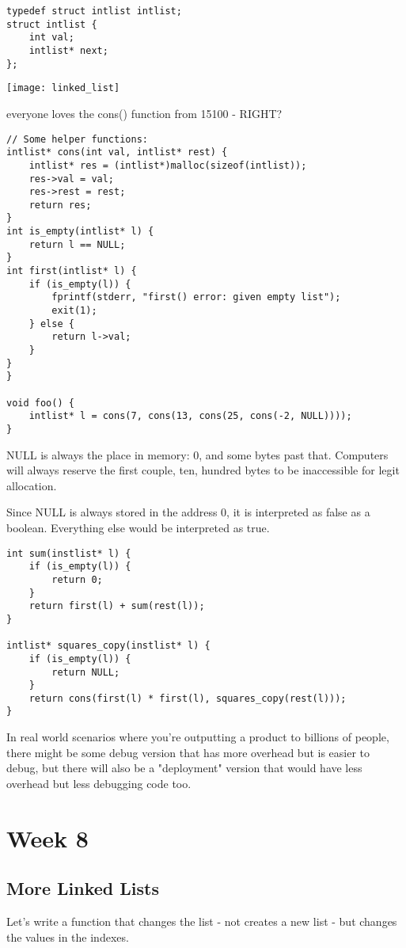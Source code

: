 \documentclass[12pt]{article}
\theoremstyle{definition}
\begin{document}
\begin{lstlisting}
typedef struct intlist intlist;
struct intlist {
    int val;
    intlist* next;
}; 
\end{lstlisting}
\begin{center}
\texttt{[image: linked\_list]}
\end{center}
everyone loves the cons() function from 15100 - RIGHT?
\begin{lstlisting}
// Some helper functions:
intlist* cons(int val, intlist* rest) {
    intlist* res = (intlist*)malloc(sizeof(intlist));
    res->val = val;
    res->rest = rest;
    return res;
}
int is_empty(intlist* l) {
    return l == NULL;
}
int first(intlist* l) {
    if (is_empty(l)) {
        fprintf(stderr, "first() error: given empty list");
        exit(1);
    } else {
        return l->val;
    }
}
}

void foo() {
    intlist* l = cons(7, cons(13, cons(25, cons(-2, NULL))));
}
\end{lstlisting}
\note NULL is always the place in memory: 0, and some bytes past that. Computers will always reserve the first couple, ten, hundred bytes to be inaccessible for legit allocation. 

Since NULL is always stored in the address 0, it is interpreted as false as a boolean. Everything else would be interpreted as true. 

\begin{lstlisting}
int sum(instlist* l) {
    if (is_empty(l)) {
        return 0;
    }
    return first(l) + sum(rest(l));
}

intlist* squares_copy(instlist* l) {
    if (is_empty(l)) {
        return NULL;
    }
    return cons(first(l) * first(l), squares_copy(rest(l)));
}
\end{lstlisting}
\idea In real world scenarios where you're outputting a product to billions of people, there might be some debug version that has more overhead but is easier to debug, but there will also be a "deployment" version that would have less overhead but less debugging code too. 
\section{Week 8}
\subsection{More Linked Lists}
Let's write a function that changes the list - not creates a new list - but changes the values in the indexes.
\end{document}
